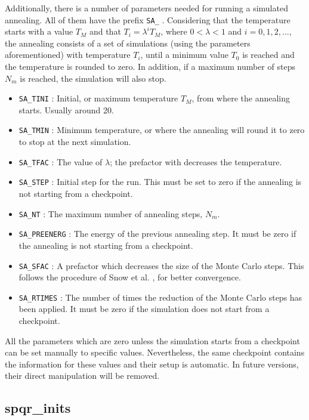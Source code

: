 \documentclass{article}
\begin{document}
Additionally, there is a number of parameters needed for running a simulated annealing. All of them have the prefix \texttt{SA\_} . Considering that the temperature starts with a value $T_M$ and that $T_i=\lambda^i T_M$, where $0<\lambda<1$ and $i=0, 1, 2,...$, the annealing consists of a set of simulations (using the parameters aforementioned) with temperature $T_i$, until a minimum value $T_0$ is reached and the temperature is rounded to zero. In addition, if a maximum number of steps $N_{m}$ is reached, the simulation will also stop.

\begin{itemize}
\item \texttt{SA\_TINI} : Initial, or maximum temperature $T_M$, from where the annealing starts. Usually around 20.
\item \texttt {SA\_TMIN} : Minimum temperature, or where the annealing will round it to zero to stop at the next simulation.
\item \texttt {SA\_TFAC} : The value of $\lambda$; the prefactor with decreases the temperature. 
\item \texttt {SA\_STEP} : Initial step for the run. This must be set to zero if the annealing is not starting from a checkpoint.
\item \texttt {SA\_NT} : The maximum number of annealing steps, $N_m$.
\item \texttt {SA\_PREENERG} : The energy of the previous annealing step. It must be zero if the annealing is not starting from a checkpoint.
\item \texttt {SA\_SFAC}  : A prefactor which decreases the size of the Monte Carlo steps. This follows the procedure of Snow et al. \cite{snow}, for better convergence. 
\item \texttt {SA\_RTIMES} : The number of times the reduction of the Monte Carlo steps has been applied. It must be zero if the simulation does not start from a checkpoint.
 
\end{itemize}

All the parameters which are zero unless the simulation starts from a checkpoint can be set manually to specific values. Nevertheless, the same checkpoint contains the information for these values and their setup is automatic. In future versions, their direct manipulation will be removed.

\subsection{spqr\_inits}
\end{document}
